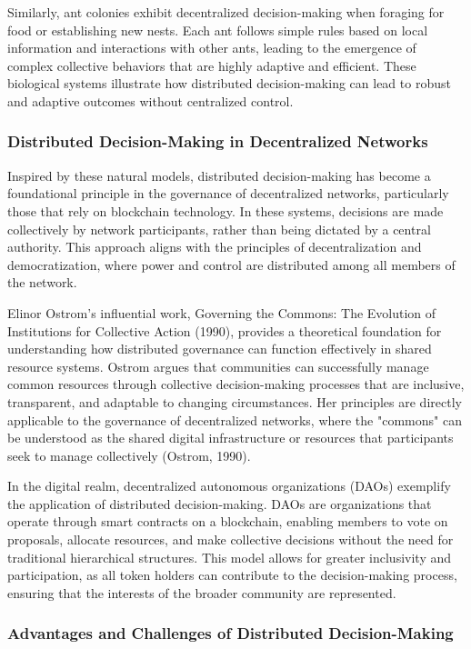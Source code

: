 \documentclass[12pt,twoside]{article}
\begin{document}
Similarly, ant colonies exhibit decentralized decision-making when foraging for food or establishing new nests. Each ant follows simple rules based on local information and interactions with other ants, leading to the emergence of complex collective behaviors that are highly adaptive and efficient. These biological systems illustrate how distributed decision-making can lead to robust and adaptive outcomes without centralized control.

\subsubsection{Distributed Decision-Making in Decentralized Networks}

Inspired by these natural models, distributed decision-making has become a foundational principle in the governance of decentralized networks, particularly those that rely on blockchain technology. In these systems, decisions are made collectively by network participants, rather than being dictated by a central authority. This approach aligns with the principles of decentralization and democratization, where power and control are distributed among all members of the network.

Elinor Ostrom's influential work, Governing the Commons: The Evolution of Institutions for Collective Action (1990), provides a theoretical foundation for understanding how distributed governance can function effectively in shared resource systems. Ostrom argues that communities can successfully manage common resources through collective decision-making processes that are inclusive, transparent, and adaptable to changing circumstances. Her principles are directly applicable to the governance of decentralized networks, where the "commons" can be understood as the shared digital infrastructure or resources that participants seek to manage collectively (Ostrom, 1990).

In the digital realm, decentralized autonomous organizations (DAOs) exemplify the application of distributed decision-making. DAOs are organizations that operate through smart contracts on a blockchain, enabling members to vote on proposals, allocate resources, and make collective decisions without the need for traditional hierarchical structures. This model allows for greater inclusivity and participation, as all token holders can contribute to the decision-making process, ensuring that the interests of the broader community are represented.

\subsubsection{Advantages and Challenges of Distributed Decision-Making}
\end{document}
